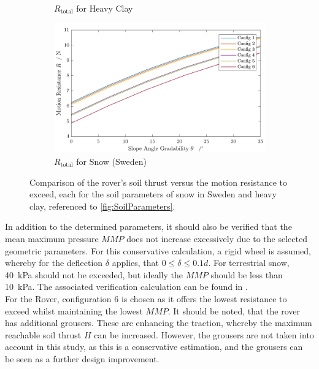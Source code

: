 \begin{figure}[htb]
\begin{subfigure}[b]{0.49\textwidth}
         \caption{\(R_\text{total}\) for Heavy Clay}
         \label{fig:RClay}
     \end{subfigure}
     \hfill
     \begin{subfigure}[b]{0.49\textwidth}
         \centering
         \includegraphics[width=\textwidth]{Media/ResistanceSnow.pdf}
         \caption{\(R_\text{total}\) for Snow (Sweden)}
         \label{fig:RSnow}
     \end{subfigure}
     \caption{Comparison of the rover's soil thrust versus the motion resistance to exceed, each for the soil parameters of snow in Sweden and heavy clay, referenced to \autoref{fig:SoilParameters}.}
     \label{fig:SoilThrust_MotionResistance}
\end{figure}

In addition to the determined parameters, it should also be verified that the mean maximum pressure \(MMP\) does not increase excessively due to the selected geometric parameters. For this conservative calculation, a rigid wheel is assumed, whereby for the deflection \(\delta\) applies, that \( 0 \leq \delta \leq 0.1 d\). For terrestrial snow, 40~kPa should not be exceeded, but ideally the \(MMP\) should be less than 10~kPa. The associated verification calculation can be found in . \\ 
For the Rover, configuration 6 is chosen as it offers the lowest resistance to exceed whilst maintaining the lowest \(MMP\). It should be noted, that the rover has additional grousers. These are enhancing the traction, whereby the maximum reachable soil thrust \(H\) can be increased. However, the grousers are not taken into account in this study, as this is a conservative estimation, and the grousers can be seen as a further design improvement. 

